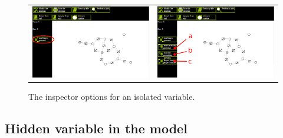 \begin{figure}
	\centering
\begin{tabular}{ll}
\begin{minipage}[t]{0.49\textwidth}
	\includegraphics[width= \columnwidth]{../src/Chapter_additional/04_EFG_GUI/image/img_09.png}
\end{minipage}
 &
\begin{minipage}[t]{0.49\textwidth}
	\includegraphics[width= \columnwidth]{../src/Chapter_additional/04_EFG_GUI/image/img_10.png}
\end{minipage}
\end{tabular}
	\caption{The inspector options for an isolated variable.}
	\label{fig:isolated}
\end{figure}

\subsection{Hidden variable in the model}
\label{sec:GUI:hidden}


